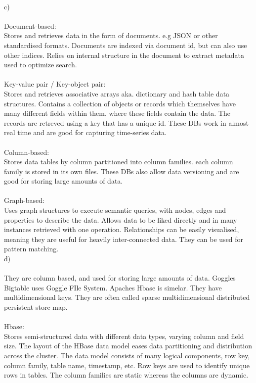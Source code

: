 \documentclass[12pt, letterpaper, twoside]{article}
\begin{document}
\ \\
c)\\
\ \\
Document-based:\\
Stores and retrieves data in the form of documents. e.g JSON or other standardised formats. Documents are indexed via document id, but can also use other indices. Relies on internal structure in the document to extract metadata used to optimize search.\\
\ \\  
Key-value pair / Key-object pair:\\
Stores and retrieves associative arrays aka. dictionary and hash table data structures. Contains a collection of objects or records which themselves have many different fields within them, where these fields contain the data. The records are retreved using a key that has a unique id. These DBs work in almost real time and are good for capturing time-series data.\\
\ \\ 
Column-based:\\
Stores data tables by column partitioned into column families. each column family is stored in its own files. These DBs also allow data versioning and are good for storing large amounts of data.\\
\ \\ 
Graph-based:\\
Uses graph structures to execute semantic queries, with nodes, edges and properties to describe the data. Allows data to be liked directly and in many instances retrieved with one operation. Relationships can be easily visualised, meaning they are useful for heavily inter-connected data. They can be used for pattern matching.   
\newpage
\ \\
d)\\
\ \\
They are column based, and used for storing large amounts of data. Goggles Bigtable uses Goggle FIle System. Apaches Hbase is simelar. They have multidimensional keys. They are often called sparse multidimensional distributed persistent store map.\\
\ \\
Hbase:\\
Stores semi-structured data with different data types, varying column and field size. The layout of the HBase data model eases data partitioning and distribution across the cluster. The data model consists of many logical components, row key, column family, table name, timestamp, etc. Row keys are used to identify unique rows in tables. The column families are static whereas the columns are dynamic.\\
\end{document}
